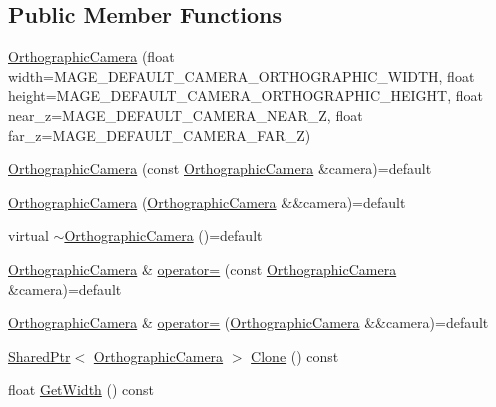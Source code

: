 \subsection*{Public Member Functions}
\begin{DoxyCompactItemize}
\item 
\hyperlink{classmage_1_1_orthographic_camera_a4a9c362b0c1cb90608b699deb3ae8b23}{Orthographic\+Camera} (float width=M\+A\+G\+E\+\_\+\+D\+E\+F\+A\+U\+L\+T\+\_\+\+C\+A\+M\+E\+R\+A\+\_\+\+O\+R\+T\+H\+O\+G\+R\+A\+P\+H\+I\+C\+\_\+\+W\+I\+D\+TH, float height=M\+A\+G\+E\+\_\+\+D\+E\+F\+A\+U\+L\+T\+\_\+\+C\+A\+M\+E\+R\+A\+\_\+\+O\+R\+T\+H\+O\+G\+R\+A\+P\+H\+I\+C\+\_\+\+H\+E\+I\+G\+HT, float near\+\_\+z=M\+A\+G\+E\+\_\+\+D\+E\+F\+A\+U\+L\+T\+\_\+\+C\+A\+M\+E\+R\+A\+\_\+\+N\+E\+A\+R\+\_\+Z, float far\+\_\+z=M\+A\+G\+E\+\_\+\+D\+E\+F\+A\+U\+L\+T\+\_\+\+C\+A\+M\+E\+R\+A\+\_\+\+F\+A\+R\+\_\+Z)
\item 
\hyperlink{classmage_1_1_orthographic_camera_a0293f01356417e9f32db027ba92d6029}{Orthographic\+Camera} (const \hyperlink{classmage_1_1_orthographic_camera}{Orthographic\+Camera} \&camera)=default
\item 
\hyperlink{classmage_1_1_orthographic_camera_a6abe78fc17b583046b30a459f9ef07ef}{Orthographic\+Camera} (\hyperlink{classmage_1_1_orthographic_camera}{Orthographic\+Camera} \&\&camera)=default
\item 
virtual \hyperlink{classmage_1_1_orthographic_camera_abdad923634e17f217ba975a9149f6c57}{$\sim$\+Orthographic\+Camera} ()=default
\item 
\hyperlink{classmage_1_1_orthographic_camera}{Orthographic\+Camera} \& \hyperlink{classmage_1_1_orthographic_camera_a38631b1c377f0e3b6fa99ac5535ce226}{operator=} (const \hyperlink{classmage_1_1_orthographic_camera}{Orthographic\+Camera} \&camera)=default
\item 
\hyperlink{classmage_1_1_orthographic_camera}{Orthographic\+Camera} \& \hyperlink{classmage_1_1_orthographic_camera_a51b38eab8945fb1a2031a7ba1755d689}{operator=} (\hyperlink{classmage_1_1_orthographic_camera}{Orthographic\+Camera} \&\&camera)=default
\item 
\hyperlink{namespacemage_a1e01ae66713838a7a67d30e44c67703e}{Shared\+Ptr}$<$ \hyperlink{classmage_1_1_orthographic_camera}{Orthographic\+Camera} $>$ \hyperlink{classmage_1_1_orthographic_camera_a4b9e8cca5814d955efe1dad1df784aba}{Clone} () const
\item 
float \hyperlink{classmage_1_1_orthographic_camera_ac8daeca630e0f4503354e3eede7ead5c}{Get\+Width} () const

\end{DoxyCompactItemize}
